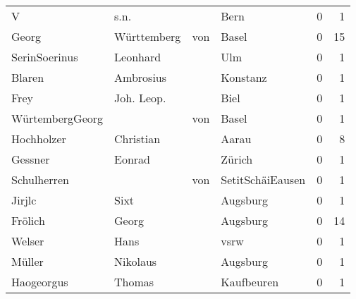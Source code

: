 \begin{center}
\begin{tiny}
\begin{longtabu}{llllrr}
                        V &                               s.n. &             &                                        Bern &          0 &         1 \\
                    Georg &                        Württemberg &         von &                                       Basel &          0 &        15 \\
            SerinSoerinus &                           Leonhard &             &                                         Ulm &          0 &         1 \\
                   Blaren &                          Ambrosius &             &                                    Konstanz &          0 &         1 \\
                     Frey &                         Joh. Leop. &             &                                        Biel &          0 &         1 \\
          WürtembergGeorg &                                    &         von &                                       Basel &          0 &         1 \\
               Hochholzer &                          Christian &             &                                       Aarau &          0 &         8 \\
                  Gessner &                             Eonrad &             &                                      Zürich &          0 &         1 \\
              Schulherren &                                    &         von &                            SetitSchäiEausen &          0 &         1 \\
                   Jirjlc &                               Sixt &             &                                    Augsburg &          0 &         1 \\
                  Frölich &                              Georg &             &                                    Augsburg &          0 &        14 \\
                   Welser &                               Hans &             &                                        vsrw &          0 &         1 \\
                   Müller &                           Nikolaus &             &                                    Augsburg &          0 &         1 \\
               Haogeorgus &                             Thomas &             &                                  Kaufbeuren &          0 &         1 \\

\end{longtabu}
\end{tiny}
\end{center}
